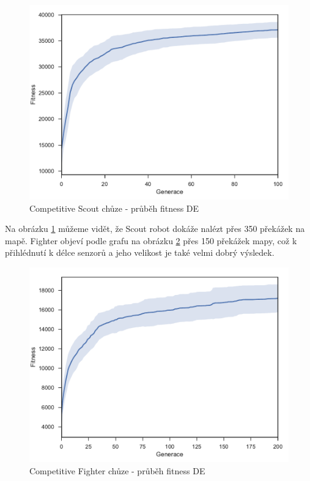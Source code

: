 \begin{figure}[t]\centering
	\includegraphics[width=0.75\columnwidth]{../img/CompetitiveMap/ScoutWalk}
	\caption{Competitive Scout chůze - průběh fitness DE}
	\label{obr04:CompetitiveScoutWalk}
\end{figure}
Na obrázku \ref{obr04:CompetitiveScoutWalk} můžeme vidět, že Scout robot dokáže nalézt přes 350 překážek na mapě. Fighter objeví podle grafu na obrázku \ref{obr04:CompetitiveFighterWalk}  přes 150 překážek mapy, což k přihlédnutí k délce senzorů a jeho velikost je také velmi dobrý výsledek.  
\begin{figure}[h]\centering
	\includegraphics[width=0.75\columnwidth]{../img/CompetitiveMap/FighterWalk}
	\caption{Competitive Fighter chůze - průběh fitness DE}
	\label{obr04:CompetitiveFighterWalk}
\end{figure}
\newpage
